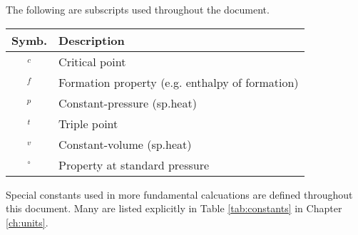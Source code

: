 The following are subscripts used throughout the document.

\vspace{1em}
\begin{tabular}{|cl|}
\hline
Symb. & Description\\
\hline
$_c$ & Critical point\\
$_f$ & Formation property (e.g. enthalpy of formation)\\
$_p$ & Constant-pressure (sp.heat)\\
$_t$ & Triple point\\
$_v$ & Constant-volume (sp.heat)\\
$^\circ$ & Property at standard pressure\\
\hline
\end{tabular}

Special constants used in more fundamental calcuations are defined throughout this document.  Many are listed explicitly in Table \ref{tab:constants} in Chapter \ref{ch:units}.
